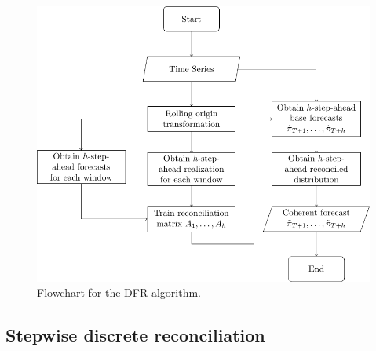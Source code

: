 \documentclass[a4paper,review,12pt,authoryear]{elsarticle}
\begin{document}
    \begin{figure}
    \centering
    \includegraphics[width=\textwidth]{figures/DFR.pdf}
    \caption{\label{fig:dfr}Flowchart for the DFR algorithm.}
    \end{figure}


    \subsection{Stepwise discrete reconciliation}
    \label{sec:algorithm2}
\end{document}
